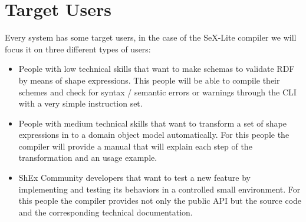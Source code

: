 \section{Target Users}

Every system has some target users, in the case of the SeX-Lite compiler we will focus it on three different types of users:
\begin{itemize}
    \item People with low technical skills that want to make schemas to validate RDF by means
    of shape expressions. This people will be able to compile their schemes and check for
    syntax / semantic errors or warnings through the CLI with a very simple instruction set.
    \item People with medium technical skills that want to transform a set of shape expressions
    in to a domain object model automatically. For this people the compiler will provide a
    manual that will explain each step of the transformation and an usage example.
    \item ShEx Community developers that want to test a new feature by implementing and
    testing its behaviors in a controlled small environment. For this people the compiler
    provides not only the public API but the source code and the corresponding technical
    documentation. 
\end{itemize}